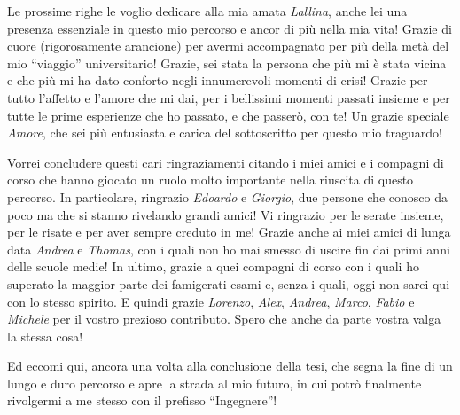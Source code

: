 \begin{acknowledgements}
  Le prossime righe le voglio dedicare alla mia amata \emph{Lallina}, anche lei una presenza essenziale in questo mio percorso e ancor di più nella mia vita! Grazie di cuore (rigorosamente arancione) per avermi accompagnato per più della metà del mio ``viaggio'' universitario! Grazie, sei stata la persona che più mi è stata vicina e che più mi ha dato conforto negli innumerevoli momenti di crisi! Grazie per tutto l'affetto e l'amore che mi dai, per i bellissimi momenti passati insieme e per tutte le prime esperienze che ho passato, e che passerò, con te! Un grazie speciale \emph{Amore}, che sei più entusiasta e carica del sottoscritto per questo mio traguardo!

  Vorrei concludere questi cari ringraziamenti citando i miei amici e i compagni di corso che hanno giocato un ruolo molto importante nella riuscita di questo percorso.
  In particolare, ringrazio \emph{Edoardo} e \emph{Giorgio}, due persone che conosco da poco ma che si stanno rivelando grandi amici! Vi ringrazio per le serate insieme, per le risate e per aver sempre creduto in me! Grazie anche ai miei amici di lunga data \emph{Andrea} e \emph{Thomas}, con i quali non ho mai smesso di uscire fin dai primi anni delle scuole medie! In ultimo, grazie a quei compagni di corso con i quali ho superato la maggior parte dei famigerati esami e, senza i quali, oggi non sarei qui con lo stesso spirito. E quindi grazie \emph{Lorenzo}, \emph{Alex}, \emph{Andrea}, \emph{Marco}, \emph{Fabio} e \emph{Michele} per il vostro prezioso contributo. Spero che anche da parte vostra valga la stessa cosa!

  Ed eccomi qui, ancora una volta alla conclusione della tesi, che segna la fine di un lungo e duro percorso e apre la strada al mio futuro, in cui potrò finalmente rivolgermi a me stesso con il prefisso ``Ingegnere''!
\end{acknowledgements}
